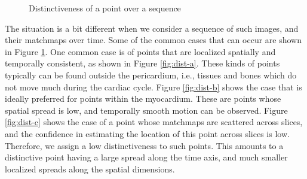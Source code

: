 \begin{figure}
\centering
     \hspace{.1in}     
     \hspace{.1in}     
     \caption{Distinctiveness of a point over a sequence}     
     \label{fig:dist-seq}
\end{figure} 

The situation is a bit different when we consider a sequence of such images, and their matchmaps over time. Some of the common cases that can occur are shown in Figure \ref{fig:dist-seq}. One common case is of points that are localized spatially and temporally consistent, as shown in Figure \ref{fig:dist-a}. These kinds of points typically can be found outside the pericardium, i.e., tissues and bones which do not move much during the cardiac cycle. Figure \ref{fig:dist-b} shows the case that is ideally preferred for points within the myocardium. These are points whose spatial spread is low, and temporally smooth motion can be observed. Figure \ref{fig:dist-c} shows the case of a point whose matchmaps are scattered across slices, and the confidence in estimating the location of this point across slices is low. Therefore, we assign a low distinctiveness to such points. This amounts to a distinctive point having a large spread along the time axis, and much smaller localized spreads along the spatial dimensions.

